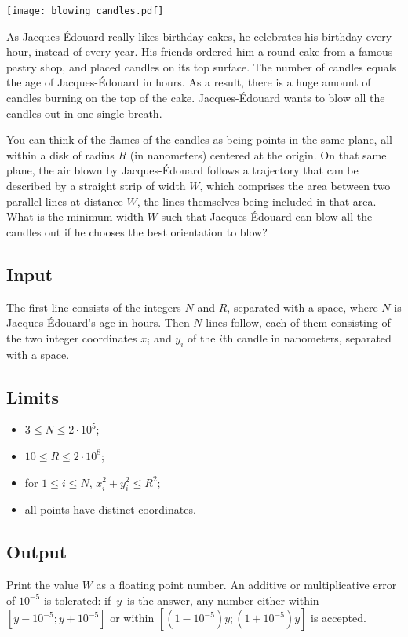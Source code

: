 
{\centering
\texttt{[image: blowing\_candles.pdf]}
\par}

\noindent As Jacques-Édouard really likes birthday cakes, he celebrates his
birthday every hour, instead of every year. His friends ordered him a
round cake from a famous pastry shop, and placed candles on its top
surface. The number of candles equals the age of Jacques-Édouard in
hours. As a result, there is a huge amount of candles burning on the top
of the cake. Jacques-Édouard wants to blow all the candles out in one
single breath.

You can think of the flames of the candles as being points in the
same plane, all within a disk of radius $R$ (in nanometers) centered at the
origin. On that same plane, the air blown by Jacques-Édouard
follows a trajectory that can be described by a straight strip of width
$W$, which comprises the area between two parallel lines at distance $W$, the
lines themselves being included in that area.  What is the minimum
width $W$ such that Jacques-Édouard can blow all the candles out if he
chooses the best orientation to blow?
\subsection*{Input}

The first line consists of the integers $N$ and $R$, separated with a
space, where $N$ is Jacques-Édouard's age in hours.
Then $N$ lines follow, each of them consisting of the two integer coordinates $x_i$
and $y_i$ of the $i$th candle in nanometers, separated with a space.

\subsection*{Limits}

\begin{itemize}
\item $3 \leq N \leq  2\cdot 10^{5}$; %
\item $10 \leq R \leq  2\cdot 10^{8}$; %
\item for $1\leq i\leq N$, $x^2_i + y^2_i
  \leq  R^{2}$;
\item all points have distinct coordinates.
\end{itemize}


\subsection*{Output}

Print the value $W$ as a floating point number. An additive or multiplicative 
error of $10^{-5}$ is tolerated: if~$y$~is the answer, any
number either within $[y-10^{-5}; y+10^{-5}]$ or within $[(1-10^{-5})y;
(1+10^{-5})y]$ is accepted.

\clearpage

